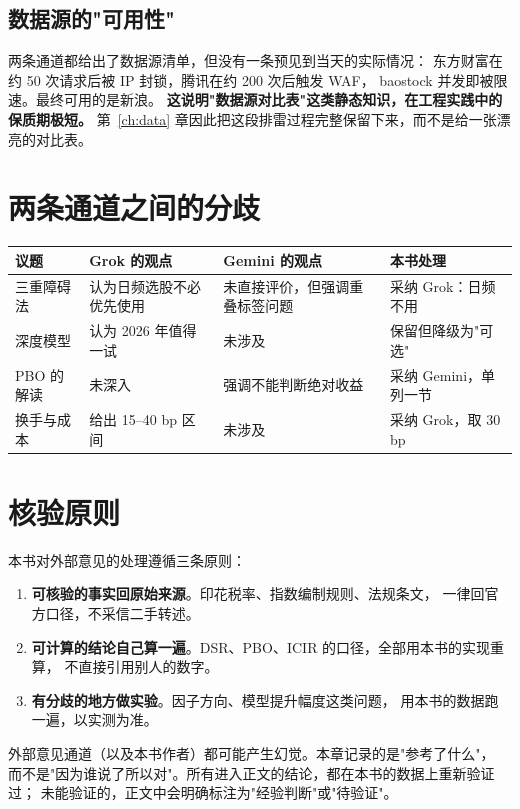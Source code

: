 \subsection{数据源的"可用性"}

两条通道都给出了数据源清单，但没有一条预见到当天的实际情况：
东方财富在约 50 次请求后被 IP 封锁，腾讯在约 200 次后触发 WAF，
baostock 并发即被限速。最终可用的是新浪。
\textbf{这说明"数据源对比表"这类静态知识，在工程实践中的保质期极短。}
第~\ref{ch:data} 章因此把这段排雷过程完整保留下来，而不是给一张漂亮的对比表。

\section{两条通道之间的分歧}

\begin{center}
\begin{tabular}{@{}p{}p{}p{}p{}@{}}
\toprule
议题 & Grok 的观点 & Gemini 的观点 & 本书处理 \\
\midrule
三重障碍法 & 认为日频选股不必优先使用 & 未直接评价，但强调重叠标签问题 & 采纳 Grok：日频不用 \\
深度模型 & 认为 2026 年值得一试 & 未涉及 & 保留但降级为"可选" \\
PBO 的解读 & 未深入 & 强调不能判断绝对收益 & 采纳 Gemini，单列一节 \\
换手与成本 & 给出 15--40 bp 区间 & 未涉及 & 采纳 Grok，取 30 bp \\
\bottomrule
\end{tabular}
\end{center}

\section{核验原则}

本书对外部意见的处理遵循三条原则：

\begin{enumerate}
  \item \textbf{可核验的事实回原始来源}。印花税率、指数编制规则、法规条文，
        一律回官方口径，不采信二手转述。
  \item \textbf{可计算的结论自己算一遍}。DSR、PBO、ICIR 的口径，全部用本书的实现重算，
        不直接引用别人的数字。
  \item \textbf{有分歧的地方做实验}。因子方向、模型提升幅度这类问题，
        用本书的数据跑一遍，以实测为准。
\end{enumerate}

\begin{warnbox}[一个必须承认的局限]
外部意见通道（以及本书作者）都可能产生幻觉。本章记录的是"参考了什么"，
而不是"因为谁说了所以对"。所有进入正文的结论，都在本书的数据上重新验证过；
未能验证的，正文中会明确标注为"经验判断"或"待验证"。
\end{warnbox}

